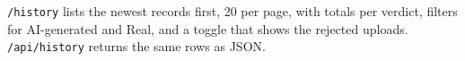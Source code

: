 \texttt{/history} lists the newest records first, 20 per page, with totals per verdict, filters for
AI-generated and Real, and a toggle that shows the rejected uploads. \texttt{/api/history} returns
the same rows as JSON.

